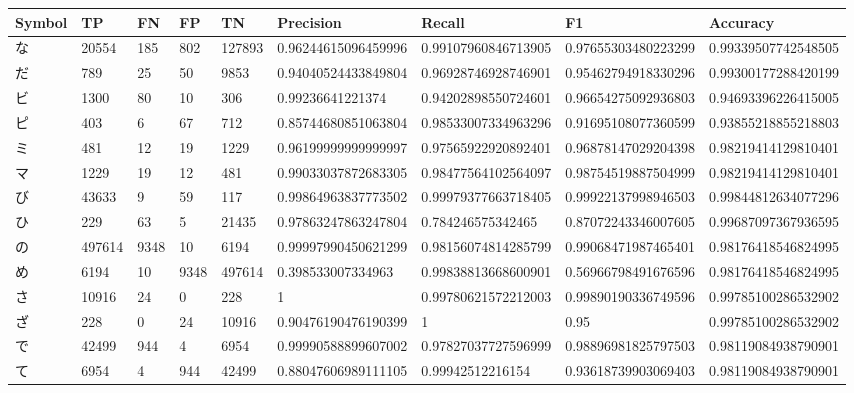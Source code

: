 \label{appendix:table}
\begin{table}[H]
	\begin{center}
		\begin{CJK}{UTF8}{min}
		\begin{tabular}{ | l | l | l | l | l | l | l | l | l | }
			\hline
			Symbol & TP & FN & FP & TN & Precision & Recall & F1 & Accuracy \\ \hline
			な & 20554 & 185 & 802 & 127893 & 0.96244615096459996 & 0.99107960846713905 & 0.97655303480223299 & 0.99339507742548505 \\ \hline
			だ & 789 & 25 & 50 & 9853 & 0.94040524433849804 & 0.96928746928746901 & 0.95462794918330296 & 0.99300177288420199 \\ \hline
			ビ & 1300 & 80 & 10 & 306 & 0.99236641221374 & 0.94202898550724601 & 0.96654275092936803 & 0.94693396226415005 \\ \hline
			ピ & 403 & 6 & 67 & 712 & 0.85744680851063804 & 0.98533007334963296 & 0.91695108077360599 & 0.93855218855218803 \\ \hline
			ミ & 481 & 12 & 19 & 1229 & 0.96199999999999997 & 0.97565922920892401 & 0.96878147029204398 & 0.98219414129810401 \\ \hline
			マ & 1229 & 19 & 12 & 481 & 0.99033037872683305 & 0.98477564102564097 & 0.98754519887504999 & 0.98219414129810401 \\ \hline
			び & 43633 & 9 & 59 & 117 & 0.99864963837773502 & 0.99979377663718405 & 0.99922137998946503 & 0.99844812634077296 \\ \hline
			ひ & 229 & 63 & 5 & 21435 & 0.97863247863247804 & 0.784246575342465 & 0.87072243346007605 & 0.99687097367936595 \\ \hline
			の & 497614 & 9348 & 10 & 6194 & 0.99997990450621299 & 0.98156074814285799 & 0.99068471987465401 & 0.98176418546824995 \\ \hline
			め & 6194 & 10 & 9348 & 497614 & 0.398533007334963 & 0.99838813668600901 & 0.56966798491676596 & 0.98176418546824995 \\ \hline
			さ & 10916 & 24 & 0 & 228 & 1 & 0.99780621572212003 & 0.99890190336749596 & 0.99785100286532902 \\ \hline
			ざ & 228 & 0 & 24 & 10916 & 0.90476190476190399 & 1 & 0.95 & 0.99785100286532902 \\ \hline
			で & 42499 & 944 & 4 & 6954 & 0.99990588899607002 & 0.97827037727596999 & 0.98896981825797503 & 0.98119084938790901 \\ \hline
			て & 6954 & 4 & 944 & 42499 & 0.88047606989111105 & 0.99942512216154 & 0.93618739903069403 & 0.98119084938790901 \\ \hline

\end{tabular}
\end{CJK}
\end{center}
\end{table}
